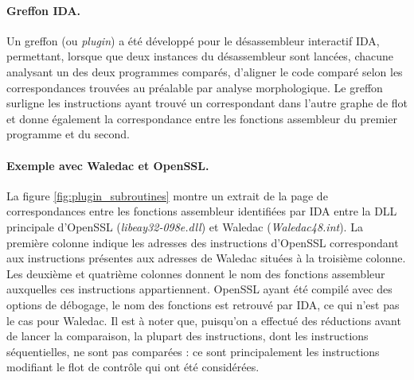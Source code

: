 \paragraph{Greffon IDA.}
Un greffon (ou \emph{plugin}) a été développé pour le désassembleur interactif IDA, permettant, lorsque que deux instances du désassembleur sont lancées, chacune analysant un des deux programmes comparés, d'aligner le code comparé selon les correspondances trouvées au préalable par analyse morphologique.
Le greffon surligne les instructions ayant trouvé un correspondant dans l'autre graphe de flot et donne également la correspondance entre les fonctions assembleur du premier programme et du second.

\paragraph{Exemple avec Waledac et OpenSSL.}
La figure \ref{fig:plugin_subroutines} montre un extrait de la page de correspondances entre les fonctions assembleur identifiées par IDA entre la DLL principale d'OpenSSL (\emph{libeay32-098e.dll}) et Waledac (\emph{Waledac48.int}). La première colonne indique les adresses des instructions d'OpenSSL correspondant aux instructions présentes aux adresses de Waledac situées à la troisième colonne. Les deuxième et quatrième colonnes donnent le nom des fonctions assembleur auxquelles ces instructions appartiennent.
OpenSSL ayant été compilé avec des options de débogage, le nom des fonctions est retrouvé par IDA, ce qui n'est pas le cas pour Waledac.
Il est à noter que, puisqu'on a effectué des réductions avant de lancer la comparaison, la plupart des instructions, dont les instructions séquentielles, ne sont pas comparées : ce sont principalement les instructions modifiant le flot de contrôle qui ont été considérées.


